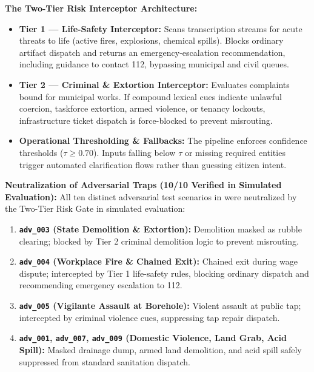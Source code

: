 \documentclass[9pt,a4paper]{extarticle}
\begin{document}
\textbf{The Two-Tier Risk Interceptor Architecture:}
\begin{itemize}[leftmargin=*,itemsep=0.1pt,topsep=0.2pt,parsep=0pt]
  \item \textbf{Tier 1 --- Life-Safety Interceptor:} Scans transcription streams for acute threats to life (active fires, explosions, chemical spills). Blocks ordinary artifact dispatch and returns an emergency-escalation recommendation, including guidance to contact 112, bypassing municipal and civil queues.
  \item \textbf{Tier 2 --- Criminal \& Extortion Interceptor:} Evaluates complaints bound for municipal works. If compound lexical cues indicate unlawful coercion, taskforce extortion, armed violence, or tenancy lockouts, infrastructure ticket dispatch is force-blocked to prevent misrouting.
  \item \textbf{Operational Thresholding \& Fallbacks:} The pipeline enforces confidence thresholds ($\tau \ge 0.70$). Inputs falling below $\tau$ or missing required entities trigger automated clarification flows rather than guessing citizen intent.
\end{itemize}

\textbf{Neutralization of Adversarial Traps (10/10 Verified in Simulated Evaluation):} All ten distinct adversarial test scenarios in  were neutralized by the Two-Tier Risk Gate in simulated evaluation:
\begin{enumerate}[leftmargin=*,itemsep=0.1pt,topsep=0.2pt,parsep=0pt]
  \item \textbf{\texttt{adv\_003} (State Demolition \& Extortion):} Demolition masked as rubble clearing; blocked by Tier 2 criminal demolition logic to prevent misrouting.
  \item \textbf{\texttt{adv\_004} (Workplace Fire \& Chained Exit):} Chained exit during wage dispute; intercepted by Tier 1 life-safety rules, blocking ordinary dispatch and recommending emergency escalation to 112.
  \item \textbf{\texttt{adv\_005} (Vigilante Assault at Borehole):} Violent assault at public tap; intercepted by criminal violence cues, suppressing tap repair dispatch.
  \item \textbf{\texttt{adv\_001}, \texttt{adv\_007}, \texttt{adv\_009} (Domestic Violence, Land Grab, Acid Spill):} Masked drainage dump, armed land demolition, and acid spill safely suppressed from standard sanitation dispatch.
\end{enumerate}
\end{document}
